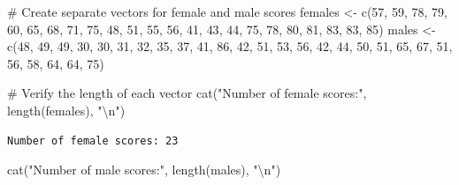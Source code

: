\documentclass[
  letterpaper,
  DIV=11,
  numbers=noendperiod]{scrartcl}
\newenvironment{Shaded}{\begin{snugshade}}{\end{snugshade}}
\newcommand{\CommentTok}[1]{\textcolor[rgb]{0.37,0.37,0.37}{#1}}
\newcommand{\DecValTok}[1]{\textcolor[rgb]{0.68,0.00,0.00}{#1}}
\newcommand{\FunctionTok}[1]{\textcolor[rgb]{0.28,0.35,0.67}{#1}}
\newcommand{\NormalTok}[1]{\textcolor[rgb]{0.00,0.23,0.31}{#1}}
\newcommand{\OtherTok}[1]{\textcolor[rgb]{0.00,0.23,0.31}{#1}}
\newcommand{\SpecialCharTok}[1]{\textcolor[rgb]{0.37,0.37,0.37}{#1}}
\newcommand{\StringTok}[1]{\textcolor[rgb]{0.13,0.47,0.30}{#1}}
\begin{document}
\begin{Shaded}
\begin{Highlighting}[]
\CommentTok{\# Create separate vectors for female and male scores}
\NormalTok{females }\OtherTok{\textless{}{-}} \FunctionTok{c}\NormalTok{(}\DecValTok{57}\NormalTok{, }\DecValTok{59}\NormalTok{, }\DecValTok{78}\NormalTok{, }\DecValTok{79}\NormalTok{, }\DecValTok{60}\NormalTok{, }\DecValTok{65}\NormalTok{, }\DecValTok{68}\NormalTok{, }\DecValTok{71}\NormalTok{, }\DecValTok{75}\NormalTok{, }\DecValTok{48}\NormalTok{, }\DecValTok{51}\NormalTok{, }\DecValTok{55}\NormalTok{, }\DecValTok{56}\NormalTok{, }\DecValTok{41}\NormalTok{, }\DecValTok{43}\NormalTok{, }\DecValTok{44}\NormalTok{, }\DecValTok{75}\NormalTok{, }\DecValTok{78}\NormalTok{, }\DecValTok{80}\NormalTok{, }\DecValTok{81}\NormalTok{, }\DecValTok{83}\NormalTok{, }\DecValTok{83}\NormalTok{, }\DecValTok{85}\NormalTok{)}
\NormalTok{males }\OtherTok{\textless{}{-}} \FunctionTok{c}\NormalTok{(}\DecValTok{48}\NormalTok{, }\DecValTok{49}\NormalTok{, }\DecValTok{49}\NormalTok{, }\DecValTok{30}\NormalTok{, }\DecValTok{30}\NormalTok{, }\DecValTok{31}\NormalTok{, }\DecValTok{32}\NormalTok{, }\DecValTok{35}\NormalTok{, }\DecValTok{37}\NormalTok{, }\DecValTok{41}\NormalTok{, }\DecValTok{86}\NormalTok{, }\DecValTok{42}\NormalTok{, }\DecValTok{51}\NormalTok{, }\DecValTok{53}\NormalTok{, }\DecValTok{56}\NormalTok{, }\DecValTok{42}\NormalTok{, }\DecValTok{44}\NormalTok{, }\DecValTok{50}\NormalTok{, }\DecValTok{51}\NormalTok{, }\DecValTok{65}\NormalTok{, }\DecValTok{67}\NormalTok{, }\DecValTok{51}\NormalTok{, }\DecValTok{56}\NormalTok{, }\DecValTok{58}\NormalTok{, }\DecValTok{64}\NormalTok{, }\DecValTok{64}\NormalTok{, }\DecValTok{75}\NormalTok{)}

\CommentTok{\# Verify the length of each vector}
\FunctionTok{cat}\NormalTok{(}\StringTok{"Number of female scores:"}\NormalTok{, }\FunctionTok{length}\NormalTok{(females), }\StringTok{"}\SpecialCharTok{\textbackslash{}n}\StringTok{"}\NormalTok{)}
\end{Highlighting}
\end{Shaded}

\begin{verbatim}
Number of female scores: 23 
\end{verbatim}

\begin{Shaded}
\begin{Highlighting}[]
\FunctionTok{cat}\NormalTok{(}\StringTok{"Number of male scores:"}\NormalTok{, }\FunctionTok{length}\NormalTok{(males), }\StringTok{"}\SpecialCharTok{\textbackslash{}n}\StringTok{"}\NormalTok{)}
\end{Highlighting}
\end{Shaded}
\end{document}

